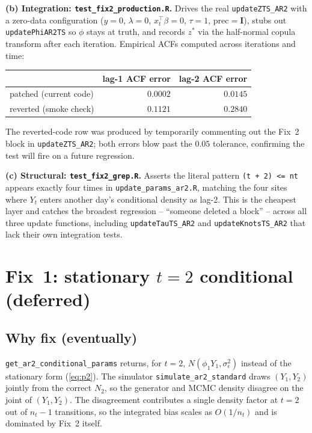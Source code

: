\documentclass[11pt]{article}
\newcommand{\bI}{\mathbf{I}}
\newcommand{\eref}[1]{(\ref{#1})}
\begin{document}
\textbf{(b) Integration: \texttt{test\_fix2\_production.R}.} Drives the real
\texttt{updateZTS\_AR2} with a zero-data configuration
($y = 0$, $\lambda = 0$, $x_t^\top \beta = 0$, $\tau = 1$, $\text{prec} = \bI$),
stubs out \texttt{updatePhiAR2TS} so $\phi$ stays at truth, and records
$z^*$ via the half-normal copula transform after each iteration. Empirical
ACFs computed across iterations and time:
\begin{center}
\begin{tabular}{lrr}
\toprule
                       & lag-1 ACF error & lag-2 ACF error \\
\midrule
patched (current code) & $0.0002$        & $0.0145$        \\
reverted (smoke check) & $0.1121$        & $0.2840$        \\
\bottomrule
\end{tabular}
\end{center}
The reverted-code row was produced by temporarily commenting out the Fix~2
block in \texttt{updateZTS\_AR2}; both errors blow past the $0.05$ tolerance,
confirming the test will fire on a future regression.

\textbf{(c) Structural: \texttt{test\_fix2\_grep.R}.} Asserts the literal
pattern \texttt{(t + 2) <= nt} appears exactly four times in
\texttt{update\_params\_ar2.R}, matching the four sites where $Y_t$ enters
another day's conditional density as lag-2. This is the cheapest layer and
catches the broadest regression -- ``someone deleted a block'' -- across all
three update functions, including \texttt{updateTauTS\_AR2} and
\texttt{updateKnotsTS\_AR2} that lack their own integration tests.

\section{Fix~1: stationary $t = 2$ conditional (deferred)}\label{ar2fix:fix1}

\subsection{Why fix (eventually)}

\texttt{get\_ar2\_conditional\_params} returns, for $t = 2$,
$N(\phi_1 Y_1, \sigma_\epsilon^2)$ instead of the stationary form
\eref{eq:p2}. The simulator \texttt{simulate\_ar2\_standard} draws $(Y_1, Y_2)$
jointly from the correct $N_2$, so the generator and MCMC density disagree on
the joint of $(Y_1, Y_2)$. The disagreement contributes a single density
factor at $t = 2$ out of $n_t - 1$ transitions, so the integrated bias scales
as $O(1/n_t)$ and is dominated by Fix~2 itself.
\end{document}
